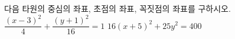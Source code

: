 다음 타원의 중심의 좌표, 초점의 좌표, 꼭짓점의 좌표를 구하시오.
 $\dfrac{(x-3)^2}{4}+\dfrac{(y+1)^2}{16}=1$
 $16(x+5)^2+25y^2=400$
